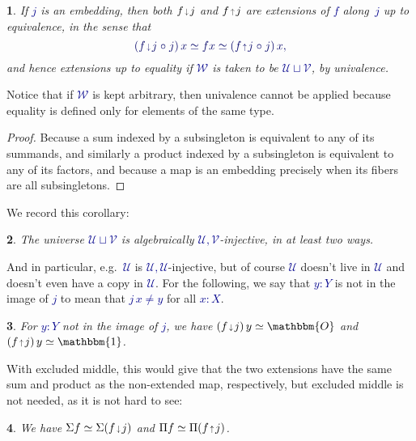 \documentclass[10pt]{article}
\newcommand{\db}{\textcolor{darkblue}}
\newcommand{\m}[1]{\db{$#1$}}
\newcommand{\M}[1]{\[\db{#1}\]}
\newcommand{\comp}{\mathrel{\circ}}
\newcommand{\U}{\mathcal{U}}
\newcommand{\V}{\mathcal{V}}
\newcommand{\W}{\mathcal{W}}
\newcommand{\Zero}{\mathbbm{O}}
\newcommand{\One}{\mathbbm{1}}
\newcommand{\edown}{\scaleobj{0.7}{\,\downarrow\,}}
\newcommand{\eup}{\scaleobj{0.7}{\,\uparrow\,}}
\newtheorem{numbered}{}
\theoremstyle{definition}
\begin{document}
\begin{numbered}
    If \m{j} is an embedding, then both \m{f \edown j} and \m{f \eup j} are extensions of \m{f} along~\m{j} up to equivalence, in the sense that \M{(f \edown j \comp j) \, x \simeq f x \simeq (f \eup j \comp j) \, x,}
and hence extensions up to equality if \m{\W} is taken to be \m{\U \sqcup \V}, by univalence.
\end{numbered}
\noindent Notice that if \m{\W} is kept arbitrary, then univalence cannot be applied because equality is defined only for elements of the same type.
\begin{proof}
Because a sum indexed by a subsingleton is equivalent to any of its
summands, and similarly a product indexed by a subsingleton is equivalent to
any of its factors, and because a map is an embedding precisely when
its fibers are all subsingletons.
\end{proof}
\noindent We record this corollary:
\begin{numbered}
  The universe \m{\U \sqcup \V} is algebraically \m{\U,\V}-injective, in at least two ways.
\end{numbered}
\noindent And in particular, e.g.\ \m{\U} is \m{\U,\U}-injective, but of course
\m{\U} doesn't live in \m{\U} and doesn't even have a copy in
\m{\U}. For the following, we say that \m{y : Y} is not in the image
of \m{j} to mean that \m{j \, x \ne y} for all \m{x:X}.
\begin{numbered}
        For \m{y:Y} not in the image of \m{j}, we have
        \m{(f \edown j) \, y \simeq \Zero} and
        \m{(f \eup j) \, y \simeq \One}.
  \end{numbered}
\noindent With excluded middle, this would give that the two extensions have
the same sum and product as the non-extended map, respectively, but
excluded middle is not needed, as it is not hard to see:
\begin{numbered} We have
\m{\Sigma f \simeq \Sigma (f \edown j)} and
\m{\Pi f \simeq \Pi (f \eup j)}.
\end{numbered}
\end{document}
